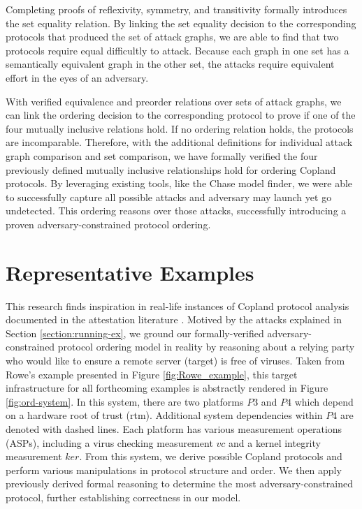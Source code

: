 \documentclass[runningheads]{llncs}
\theoremstyle{definition}
\begin{document}

\noindent Completing proofs of reflexivity, symmetry, and transitivity formally introduces the set equality relation. By linking the set equality decision to the corresponding protocols that produced the set of attack graphs, we are able to find that two protocols require equal difficultly to attack. Because each graph in one set has a semantically equivalent graph in the other set, the attacks require equivalent effort in the eyes of an adversary. 

With verified equivalence and preorder relations over sets of attack graphs, we can link the ordering decision to the corresponding protocol to prove if one of the four mutually inclusive relations hold. If no ordering relation holds, the protocols are incomparable. Therefore, with the additional definitions for individual attack graph comparison and set comparison, we have formally verified the four previously defined mutually inclusive relationships hold for ordering Copland protocols. By leveraging existing tools, like the Chase model finder, we were able to successfully capture all possible attacks and adversary may launch yet go undetected. This ordering reasons over those attacks, successfully introducing a proven adversary-constrained protocol ordering. 

\section{Representative Examples}


This research finds inspiration in real-life instances of Copland protocol analysis documented in the attestation literature \cite{Rowe:2021:OnOrdering,Coker::Principles-of-R}. Motived by the attacks explained in Section \ref{section:running-ex}, we ground our formally-verified adversary-constrained protocol ordering model in reality by reasoning about a relying party who would like to ensure a remote server (target) is free of viruses. Taken from Rowe's \cite{Rowe:2016:Confining} example presented in Figure \ref{fig:Rowe_example}, this target infrastructure for all forthcoming examples is abstractly rendered in Figure \ref{fig:ord-system}. In this system, there are two platforms $P3$ and $P4$ which depend on a hardware root of trust (rtm). Additional system dependencies within $P4$ are denoted with dashed lines.  Each platform has various measurement operations (ASPs), including a virus checking measurement $vc$ and a kernel integrity measurement $ker$. From this system, we derive possible Copland protocols and perform various manipulations in protocol structure and order. We then apply previously derived formal reasoning to determine the most adversary-constrained protocol, further establishing correctness in our model.
\end{document}
